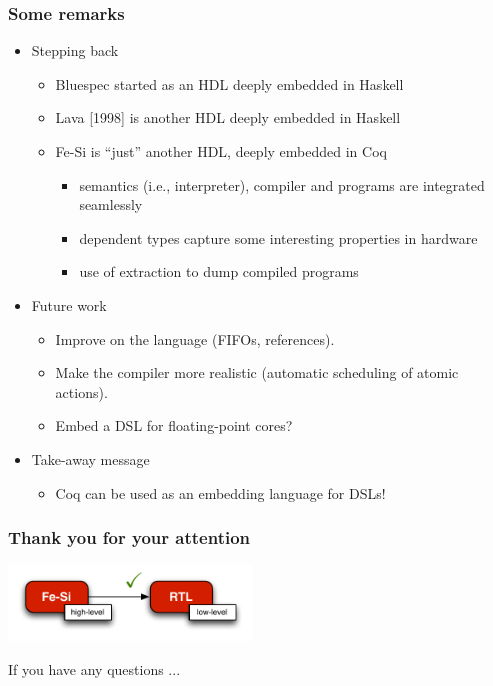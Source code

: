 \documentclass[9pt]{beamer}
\newcommand\fesi{Fe-Si}
\begin{document}
\begin{frame}[fragile]
  \frametitle{Some remarks}
  \begin{itemize}

  \item Stepping back
    \begin{itemize}
    \item Bluespec started as an HDL deeply embedded in Haskell
    \item Lava [1998] is another HDL deeply embedded in Haskell
    \item \fesi{} is ``just'' another HDL,  deeply embedded in \alert{Coq}
      \pause
      \begin{itemize}
      \item semantics (i.e., interpreter), compiler and programs are \alert{integrated seamlessly}
      \item dependent types capture some interesting properties in
        hardware
      \item use of extraction to dump compiled programs
      \end{itemize}
    \end{itemize}

    \pause
    
  \item Future work
    \begin{itemize}
    \item Improve on the language (FIFOs, references).
    \item Make the compiler more realistic (automatic scheduling of
      atomic actions).
    \item Embed a DSL for floating-point cores? 
    \end{itemize}
    
    \pause

  \item Take-away message
    \begin{itemize}
    \item Coq can be used as an embedding language for DSLs!
    \end{itemize}
    
  \end{itemize}
\end{frame}

\begin{frame}
  \frametitle{Thank you for your attention}
  
  \begin{center}
    \includegraphics[height= 2cm ]{figs/compilation.pdf}

    \vspace{1cm}

    If you have any questions ... \\
  \end{center}
  
\end{frame}
\end{document}
